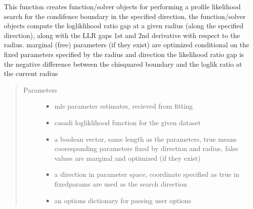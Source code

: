 \documentclass[letterpaper,10pt,english]{sphinxmanual}
\begin{document}
\begin{fulllineitems}
\begin{fulllineitems}
\end{fulllineitems}


\begin{fulllineitems}
\label{\detokenize{nloed:nloed.model.Model.__profilesetup}}
This function creates function/solver objects for performing a profile likelihood search for the condifence boundary
in the specified direction,  the function/solver objects compute the logliklihood ratio gap
at a given radius (along the specified direction),  along with the LLR gaps 1st and 2nd derivative with respect to the radius.
marginal (free) parameters (if they exist) are optimized conditional on the fixed parameters specified by the radius and direction
the likelihood ratio gap is the negative difference between the chi\sphinxhyphen{}squared boundary and the loglik ratio at the current radius
\begin{quote}\begin{description}
\item[{Parameters}] \leavevmode\begin{itemize}
\item {} 
 \textendash{} mle parameter estimates,  recieved from fitting

\item {} 
 \textendash{} casadi logliklihood function for the given dataset

\item {} 
 \textendash{} a boolean vector,  same length as the parameters,  true means cooresponding parameters fixed by direction and radius,  false values are marginal and optimized (if they exist)

\item {} 
 \textendash{} a direction in parameter space,  coordinate specified as true in fixedparams are used as the search direction

\item {} 
 \textendash{} an options dictionary for passing user options


\end{itemize}
\end{description}
\end{quote}
\end{fulllineitems}
\end{fulllineitems}
\end{document}
